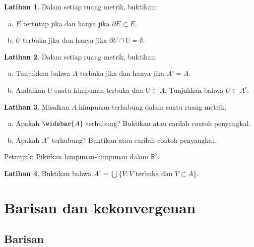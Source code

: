 \documentclass[12pt,openany]{book}
\newcommand{\R}{{\mathbb{R}}}
\theoremstyle{plain}
\theoremstyle{remark}
\theoremstyle{definition}
\newenvironment{exbox}{%
    \def\FrameCommand{\vrule width 1pt \relax\hspace{10pt}}%
    \MakeFramed{\advance\hsize-\width\FrameRestore}%
}{%
    \endMakeFramed
}
\newenvironment{exparts}{%
    \leavevmode\begin{enumerate}[a),noitemsep,topsep=0pt,parsep=0pt,partopsep=0pt]
}{%
    \end{enumerate}
}
\theoremstyle{exercise}
\newtheorem{exercise}{Latihan}[section]
\theoremstyle{example}
\begin{document}
\begin{exbox}
\begin{exercise}
Dalam setiap ruang metrik, buktikan:
\begin{exparts}
\item
$E$ tertutup jika dan hanya jika $\partial E \subset E$.
\item
$U$ terbuka jika dan hanya jika $\partial U \cap U = \emptyset$.
\end{exparts}
\end{exercise}

\begin{exercise}
Dalam setiap ruang metrik, buktikan:
\begin{exparts}
\item
Tunjukkan bahwa $A$ terbuka jika dan hanya jika $A^\circ = A$.
\item
Andaikan $U$ suatu himpunan terbuka dan $U \subset A$. Tunjukkan
bahwa $U \subset A^\circ$.
\end{exparts}
\end{exercise}

\begin{exercise}
Misalkan $A$ himpunan terhubung dalam suatu ruang metrik.
\begin{exparts}
\item
Apakah $\widebar{A}$ terhubung? Buktikan atau carilah contoh penyangkal.
\item
Apakah $A^\circ$ terhubung? Buktikan atau carilah contoh penyangkal.
\end{exparts}
Petunjuk: Pikirkan himpunan-himpunan dalam $\R^2$.
\end{exercise}

\begin{exercise}
Buktikan bahwa
$A^\circ = \bigcup \{ V : V \text{ terbuka dan } V \subset A \}$.
\end{exercise}
\end{exbox}


\section{Barisan dan kekonvergenan}
\label{sec:metseqs}

\subsection{Barisan}
\end{document}
